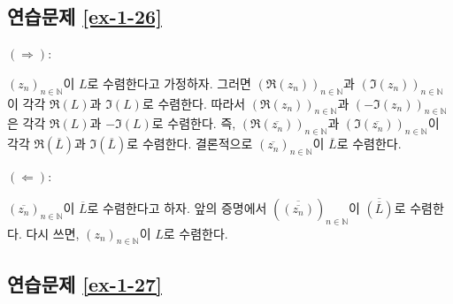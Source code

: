 \subsection*{연습문제 \ref{ex-1-26}}

$(\Rightarrow):$

$(z_n)_{n\in\mathbb N}$이 $L$로 수렴한다고 가정하자.
그러면 $(\Re(z_n))_{n\in\mathbb N}$과 
$(\Im(z_n))_{n\in\mathbb N}$이 각각 
$\Re(L)$과 $\Im(L)$로 수렴한다.
따라서 $(\Re(z_n))_{n\in\mathbb N}$과 
$(-\Im(z_n))_{n\in\mathbb N}$은 각각 
$\Re(L)$과 $-\Im(L)$로 수렴한다.
즉, $(\Re(\overline{z_n}))_{n\in\mathbb N}$과 
$(\Im(\overline{z_n}))_{n\in\mathbb N}$이 각각 
$\Re(\overline{L})$과 $\Im(\overline{L})$로 수렴한다.
결론적으로 $(\overline{z_n})_{n\in\mathbb N}$이 $\overline{L}$로 수렴한다.

\noindent $(\Leftarrow):$ 

$(\overline{z_n})_{n\in\mathbb N}$이 $\overline{L}$로 수렴한다고 하자.
앞의 증명에서 $(\overline{(\overline{z_n})})_{n\in\mathbb N}$이 
$\overline{(\overline{L})}$로 수렴한다.
다시 쓰면, $(z_n)_{n\in\mathbb N}$이 $L$로 수렴한다.

\subsection*{연습문제 \ref{ex-1-27}}


